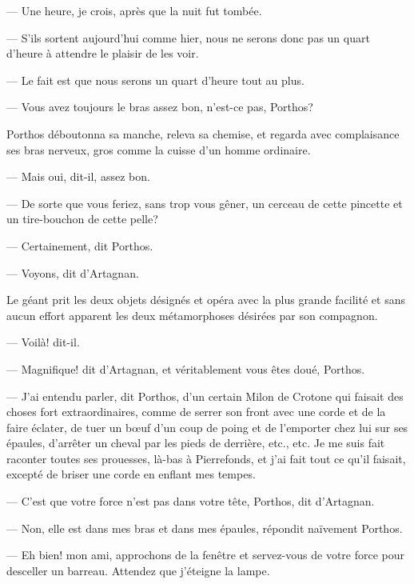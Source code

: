 — Une heure, je crois, après que la nuit fut tombée.

— S'ils sortent aujourd'hui comme hier, nous ne serons donc pas un quart d'heure à attendre le plaisir de les voir.

— Le fait est que nous serons un quart d'heure tout au plus.

— Vous avez toujours le bras assez bon, n'est-ce pas, Porthos?

Porthos déboutonna sa manche, releva sa chemise, et regarda avec complaisance ses bras nerveux, gros comme la cuisse d'un homme ordinaire.

— Mais oui, dit-il, assez bon.

— De sorte que vous feriez, sans trop vous gêner, un cerceau de cette pincette et un tire-bouchon de cette pelle?

— Certainement, dit Porthos.

— Voyons, dit d'Artagnan.

Le géant prit les deux objets désignés et opéra avec la plus grande facilité et sans aucun effort apparent les deux métamorphoses désirées par son compagnon.

— Voilà! dit-il.

— Magnifique! dit d'Artagnan, et véritablement vous êtes doué, Porthos.

— J'ai entendu parler, dit Porthos, d'un certain Milon de Crotone qui faisait des choses fort extraordinaires, comme de serrer son front avec une corde et de la faire éclater, de tuer un bœuf d'un coup de poing et de l'emporter chez lui sur ses épaules, d'arrêter un cheval par les pieds de derrière, etc., etc. Je me suis fait raconter toutes ses prouesses, là-bas à Pierrefonds, et j'ai fait tout ce qu'il faisait, excepté de briser une corde en enflant mes tempes.

— C'est que votre force n'est pas dans votre tête, Porthos, dit d'Artagnan.

— Non, elle est dans mes bras et dans mes épaules, répondit naïvement Porthos.

— Eh bien! mon ami, approchons de la fenêtre et servez-vous de votre force pour desceller un barreau. Attendez que j'éteigne la lampe.
